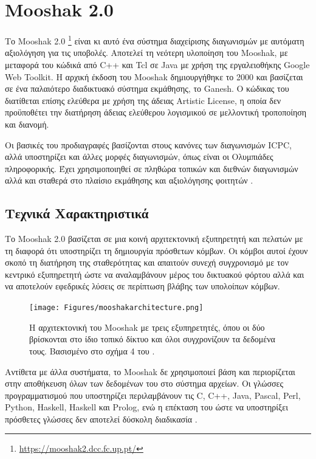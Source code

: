 \documentclass[diploma]{softlab-thesis}
\begin{document}
\FloatBarrier

\section{Mooshak 2.0}

Το Mooshak 2.0 \footnote{\url{https://mooshak2.dcc.fc.up.pt/}} είναι κι αυτό ένα
σύστημα διαχείρισης διαγωνισμών με αυτόματη αξιολόγηση για τις υποβολές.
Αποτελεί τη νεότερη υλοποίηση του Mooshak, με μεταφορά του κώδικά από C++ και
Tcl σε Java με χρήση της εργαλειοθήκης Google Web Toolkit. H αρχική έκδοση του
Mooshak δημιουργήθηκε το 2000 και βασίζεται σε ένα παλαιότερο διαδικτυακό
σύστημα εκμάθησης, το Ganesh. Ο κώδικας του διατίθεται επίσης ελεύθερα με χρήση
της άδειας Artistic License, η οποία δεν προϋποθέτει την διατήρηση άδειας
ελεύθερου λογισμικού σε μελλοντική τροποποίηση και διανομή.

\bigskip

Οι βασικές του προδιαγραφές βασίζονται στους κανόνες των διαγωνισμών ICPC, αλλά
υποστηρίζει και άλλες μορφές διαγωνισμών, όπως είναι οι Ολυμπιάδες πληροφορικής.
Έχει χρησιμοποιηθεί σε πληθώρα τοπικών και διεθνών διαγωνισμών αλλά και σταθερά
στο πλαίσιο εκμάθησης και αξιολόγησης φοιτητών \cite{leal2008using}.

\subsection{Τεχνικά Χαρακτηριστικά}

Το Mooshak 2.0 βασίζεται σε μια κοινή αρχιτεκτονική εξυπηρετητή και πελατών με τη
διαφορά ότι υποστηρίζει τη δημιουργία πρόσθετων κόμβων. Οι κόμβοι αυτοί έχουν σκοπό
τη διατήρηση της σταθερότητας και απαιτούν συνεχή συγχρονισμό με τον κεντρικό
εξυπηρετητή ώστε να αναλαμβάνουν μέρος του δικτυακού φόρτου αλλά και να αποτελούν
εφεδρικές λύσεις σε περίπτωση βλάβης των υπολοίπων κόμβων.

\bigskip

\begin{figure}
  \centering
  \texttt{[image: Figures/mooshakarchitecture.png]}
  \caption[Η αρχιτεκτονική του Mooshak]{Η αρχιτεκτονική του Mooshak με τρεις
  εξυπηρετητές, όπου οι δύο βρίσκονται στο ίδιο τοπικό δίκτυο και όλοι
  συγχρονίζουν τα δεδομένα τους. Βασισμένο στο σχήμα 4 του
  \cite{leal2003mooshak}.}
\end{figure}

\bigskip

Αντίθετα με άλλα συστήματα, το Mooshak δε χρησιμοποιεί βάση και περιορίζεται
στην αποθήκευση όλων των δεδομένων του στο σύστημα αρχείων. Οι γλώσσες
προγραμματισμού που υποστηρίζει περιλαμβάνουν τις C, C++, Java, Pascal, Perl,
Python, Haskell, Haskell και Prolog, ενώ η επέκταση του ώστε να υποστηρίξει
πρόσθετες γλώσσες δεν αποτελεί δύσκολη διαδικασία \cite{ribeiro2008early}.
\end{document}
